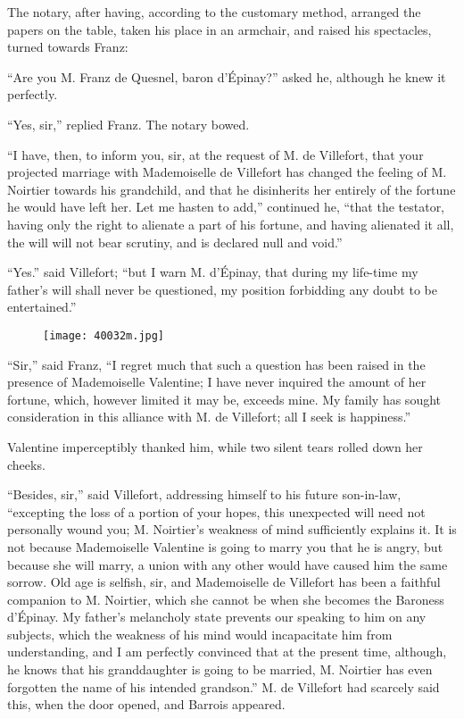 The notary, after having, according to the customary method, arranged
the papers on the table, taken his place in an armchair, and raised his
spectacles, turned towards Franz:

“Are you M. Franz de Quesnel, baron d’Épinay?” asked he, although he
knew it perfectly.

“Yes, sir,” replied Franz. The notary bowed.

“I have, then, to inform you, sir, at the request of M. de Villefort,
that your projected marriage with Mademoiselle de Villefort has changed
the feeling of M. Noirtier towards his grandchild, and that he
disinherits her entirely of the fortune he would have left her. Let me
hasten to add,” continued he, “that the testator, having only the right
to alienate a part of his fortune, and having alienated it all, the
will will not bear scrutiny, and is declared null and void.”

“Yes.” said Villefort; “but I warn M. d’Épinay, that during my
life-time my father’s will shall never be questioned, my position
forbidding any doubt to be entertained.”

\begin{figure}[ht]
\texttt{[image: 40032m.jpg]}
\end{figure}

“Sir,” said Franz, “I regret much that such a question has been raised
in the presence of Mademoiselle Valentine; I have never inquired the
amount of her fortune, which, however limited it may be, exceeds mine.
My family has sought consideration in this alliance with M. de
Villefort; all I seek is happiness.”

Valentine imperceptibly thanked him, while two silent tears rolled down
her cheeks.

“Besides, sir,” said Villefort, addressing himself to his future
son-in-law, “excepting the loss of a portion of your hopes, this
unexpected will need not personally wound you; M. Noirtier’s weakness
of mind sufficiently explains it. It is not because Mademoiselle
Valentine is going to marry you that he is angry, but because she will
marry, a union with any other would have caused him the same sorrow.
Old age is selfish, sir, and Mademoiselle de Villefort has been a
faithful companion to M. Noirtier, which she cannot be when she becomes
the Baroness d’Épinay. My father’s melancholy state prevents our
speaking to him on any subjects, which the weakness of his mind would
incapacitate him from understanding, and I am perfectly convinced that
at the present time, although, he knows that his granddaughter is going
to be married, M. Noirtier has even forgotten the name of his intended
grandson.” M. de Villefort had scarcely said this, when the door
opened, and Barrois appeared.

